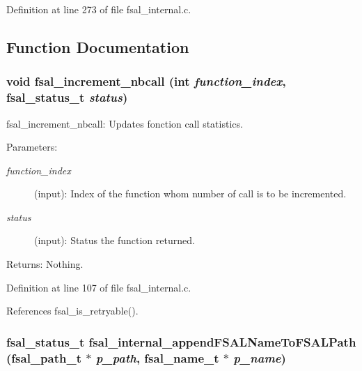 Definition at line 273 of file fsal\_\-internal.c.

\subsection{Function Documentation}
\subsubsection[{fsal\_\-increment\_\-nbcall}]{\setlength{\rightskip}{0pt plus 5cm}void fsal\_\-increment\_\-nbcall (int {\em function\_\-index}, \/  fsal\_\-status\_\-t {\em status})}\label{fsal__internal_8c_79dcb2ba7f283a1ba5c6010d76fa88f1}


fsal\_\-increment\_\-nbcall: Updates fonction call statistics.

\begin{Desc}
\item[Parameters:]
\begin{description}
\item[{\em function\_\-index}](input): Index of the function whom number of call is to be incremented. \item[{\em status}](input): Status the function returned.\end{description}
\end{Desc}
\begin{Desc}
\item[Returns:]Nothing. \end{Desc}


Definition at line 107 of file fsal\_\-internal.c.

References fsal\_\-is\_\-retryable().
\subsubsection[{fsal\_\-internal\_\-appendFSALNameToFSALPath}]{\setlength{\rightskip}{0pt plus 5cm}fsal\_\-status\_\-t fsal\_\-internal\_\-appendFSALNameToFSALPath (fsal\_\-path\_\-t $\ast$ {\em p\_\-path}, \/  fsal\_\-name\_\-t $\ast$ {\em p\_\-name})}\label{fsal__internal_8c_acfc95a6de27ac00c3a1168440aaabdf}


